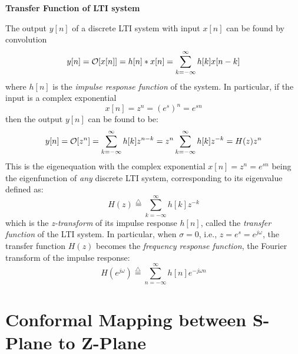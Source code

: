 {\bf Transfer Function of LTI system}

The output $y[n]$ of a discrete LTI system with input $x[n]$ can be found 
by convolution
\[ y[n]={\cal O}[x[n]]=h[n]*x[n]=\sum_{k=-\infty}^\infty h[k]x[n-k] 	\]
where $h[n]$ is the {\em impulse response function} of the system. In 
particular, if the input is a complex exponential
\[	x[n]=z^n=(e^s)^n=e^{sn}	\]
then the output $y[n]$ can be found to be:
\[	y[n]={\cal O}[z^n]=\sum_{k=-\infty}^\infty h[k]z^{n-k}
	=z^n \sum_{k=-\infty}^\infty h[k]z^{-k}=H(z) z^n	\]
This is the eigenequation with the complex exponential $x[n]=z^n=e^{sn}$ being
the eigenfunction of {\em any} discrete LTI system, corresponding to its 
eigenvalue defined as:
\[	H(z)\stackrel{\triangle}{=}\sum_{k=-\infty}^\infty h[k] z^{-k} \]
which is the {\em z-transform} of its impulse response $h[n]$, called the
{\em transfer function} of the LTI system. In particular, when $\sigma=0$,
i.e., $z=e^s=e^{j\omega}$, the transfer function $H(z)$ becomes the 
{\em frequency response function}, the Fourier transform of the impulse 
response:
\[ H(e^{j\omega})\stackrel{\triangle}{=}\sum_{n=-\infty}^\infty h[n] e^{-j\omega n} \]

\newpage
\section*{Conformal Mapping between S-Plane to Z-Plane}

